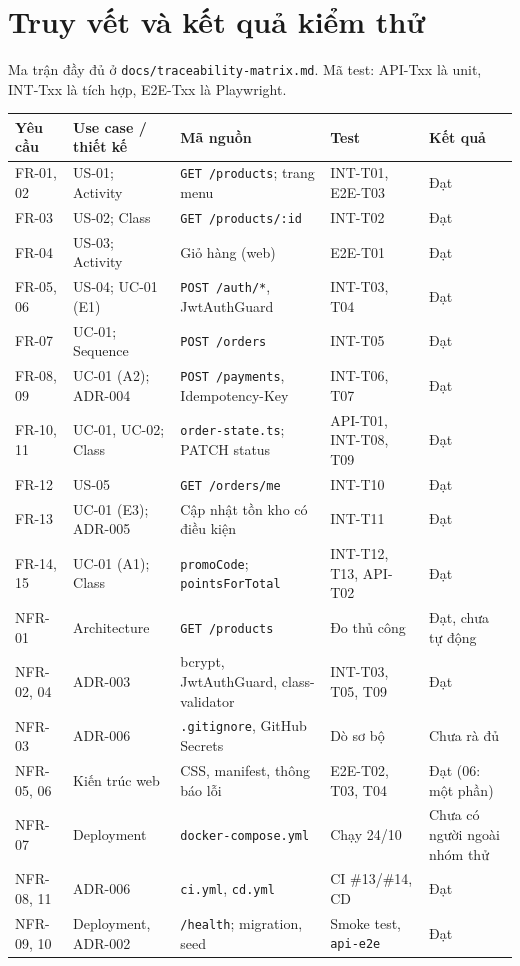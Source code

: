 \documentclass[a4paper]{article}
\begin{document}
\section{Truy vết và kết quả kiểm thử}
Ma trận đầy đủ ở \texttt{docs/traceability-matrix.md}. Mã test: API-Txx là unit, INT-Txx là tích hợp, E2E-Txx là Playwright.
\begin{center}
\footnotesize\everymath{}
\begin{longtable}{@{}p{1.5cm}p{2.7cm}p{4.2cm}p{2.7cm}p{2.1cm}@{}}
\toprule \textbf{Yêu cầu} & \textbf{Use case / thiết kế} & \textbf{Mã nguồn} & \textbf{Test} & \textbf{Kết quả} \\ \midrule \endhead
FR-01, 02 & US-01; Activity & \texttt{GET /products}; trang menu & INT-T01, E2E-T03 & Đạt \\
FR-03 & US-02; Class & \texttt{GET /products/:id} & INT-T02 & Đạt \\
FR-04 & US-03; Activity & Giỏ hàng (web) & E2E-T01 & Đạt \\
FR-05, 06 & US-04; UC-01 (E1) & \texttt{POST /auth/*}, JwtAuthGuard & INT-T03, T04 & Đạt \\
FR-07 & UC-01; Sequence & \texttt{POST /orders} & INT-T05 & Đạt \\
FR-08, 09 & UC-01 (A2); ADR-004 & \texttt{POST /payments}, Idempotency-Key & INT-T06, T07 & Đạt \\
FR-10, 11 & UC-01, UC-02; Class & \texttt{order-state.ts}; PATCH status & API-T01, INT-T08, T09 & Đạt \\
FR-12 & US-05 & \texttt{GET /orders/me} & INT-T10 & Đạt \\
FR-13 & UC-01 (E3); ADR-005 & Cập nhật tồn kho có điều kiện & INT-T11 & Đạt \\
FR-14, 15 & UC-01 (A1); Class & \texttt{promoCode}; \texttt{pointsForTotal} & INT-T12, T13, API-T02 & Đạt \\
NFR-01 & Architecture & \texttt{GET /products} & Đo thủ công & Đạt, chưa tự động \\
NFR-02, 04 & ADR-003 & bcrypt, JwtAuthGuard, class-validator & INT-T03, T05, T09 & Đạt \\
NFR-03 & ADR-006 & \texttt{.gitignore}, GitHub Secrets & Dò sơ bộ & Chưa rà đủ \\
NFR-05, 06 & Kiến trúc web & CSS, manifest, thông báo lỗi & E2E-T02, T03, T04 & Đạt (06: một phần) \\
NFR-07 & Deployment & \texttt{docker-compose.yml} & Chạy 24/10 & Chưa có người ngoài nhóm thử \\
NFR-08, 11 & ADR-006 & \texttt{ci.yml}, \texttt{cd.yml} & CI \#13/\#14, CD & Đạt \\
NFR-09, 10 & Deployment, ADR-002 & \texttt{/health}; migration, seed & Smoke test, \texttt{api-e2e} & Đạt \\
\bottomrule
\end{longtable}
\end{center}
\end{document}
